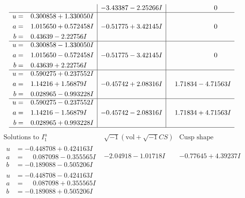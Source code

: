 \documentclass[1p]{elsarticle_modified}
\theoremstyle{definition}
\newcommand{\I}{\sqrt{-1}}
\begin{document}
$$\begin{array}{c|c|c}
 & -3.43387 - 2.25266 I & \phantom{-0.000000 } 0 \\ \hline\begin{aligned}
u &= \phantom{-}0.300858 + 1.330050 I \\
a &= \phantom{-}1.015650 + 0.572458 I \\
b &= \phantom{-}0.43639 - 2.22756 I\end{aligned}
 & -0.51775 + 3.42145 I & \phantom{-0.000000 } 0 \\ \hline\begin{aligned}
u &= \phantom{-}0.300858 - 1.330050 I \\
a &= \phantom{-}1.015650 - 0.572458 I \\
b &= \phantom{-}0.43639 + 2.22756 I\end{aligned}
 & -0.51775 - 3.42145 I & \phantom{-0.000000 } 0 \\ \hline\begin{aligned}
u &= \phantom{-}0.590275 + 0.237552 I \\
a &= \phantom{-}1.14216 + 1.56879 I \\
b &= \phantom{-}0.028965 - 0.993228 I\end{aligned}
 & -0.45742 + 2.08316 I & \phantom{-}1.71834 - 4.71563 I \\ \hline\begin{aligned}
u &= \phantom{-}0.590275 - 0.237552 I \\
a &= \phantom{-}1.14216 - 1.56879 I \\
b &= \phantom{-}0.028965 + 0.993228 I\end{aligned}
 & -0.45742 - 2.08316 I & \phantom{-}1.71834 + 4.71563 I\\
 \hline 
 \end{array}$$\newpage$$\begin{array}{c|c|c}  
\text{Solutions to }I^u_{1}& \I (\text{vol} + \sqrt{-1}CS) & \text{Cusp shape}\\
 \hline 
\begin{aligned}
u &= -0.448708 + 0.424163 I \\
a &= \phantom{-}0.087098 - 0.355565 I \\
b &= -0.189088 - 0.505206 I\end{aligned}
 & -2.04918 - 1.01718 I & -0.77645 + 4.39237 I \\ \hline\begin{aligned}
u &= -0.448708 - 0.424163 I \\
a &= \phantom{-}0.087098 + 0.355565 I \\
b &= -0.189088 + 0.505206 I\end{aligned}

\end{array}$$
\end{document}
